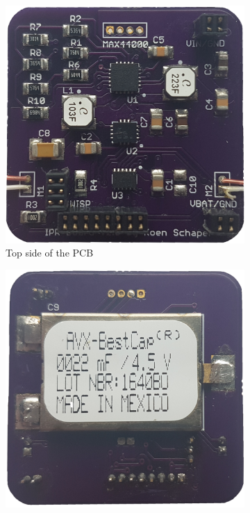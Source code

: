 
\begin{figure}[h!]
	\centering
	\begin{subfigure}[b]{0.45\textwidth}
		\includegraphics[width=\textwidth]{pics/pcb_front.jpg}
		\caption{Top side of the PCB}
		\label{fig:pcb_robot_front}
	\end{subfigure}
	\qquad
	\begin{subfigure}[b]{0.45\textwidth}
		\includegraphics[width=\textwidth]{pics/pcb_back.jpg}

\end{subfigure}
\end{figure}
